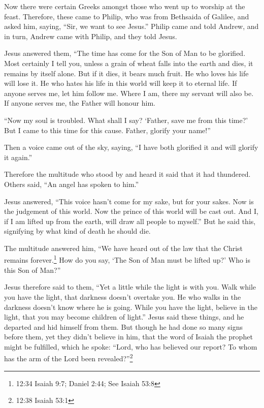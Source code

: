  Now there were certain Greeks amongst those who went up to
worship at the feast.  Therefore, these came to Philip, who
was from Bethsaida of Galilee, and asked him, saying, ``Sir, we want to
see Jesus.''  Philip came and told Andrew, and in turn,
Andrew came with Philip, and they told Jesus.

 Jesus answered them, ``The time has come for the Son of
Man to be glorified.  Most certainly I tell you, unless a
grain of wheat falls into the earth and dies, it remains by itself
alone. But if it dies, it bears much fruit.  He who loves
his life will lose it. He who hates his life in this world will keep it
to eternal life.  If anyone serves me, let him follow me.
Where I am, there my servant will also be. If anyone serves me, the
Father will honour him.

 ``Now my soul is troubled. What shall I say? `Father, save
me from this time?' But I came to this time for this cause.
 Father, glorify your name!''

Then a voice came out of the sky, saying, ``I have both glorified it and
will glorify it again.''

 Therefore the multitude who stood by and heard it said
that it had thundered. Others said, ``An angel has spoken to him.''

 Jesus answered, ``This voice hasn't come for my sake, but
for your sakes.  Now is the judgement of this world. Now
the prince of this world will be cast out.  And I, if I am
lifted up from the earth, will draw all people to myself.''
 But he said this, signifying by what kind of death he
should die.

 The multitude answered him, ``We have heard out of the law
that the Christ remains forever.\footnote{12:34 Isaiah 9:7; Daniel 2:44;
  See Isaiah 53:8} How do you say, `The Son of Man must be lifted up?'
Who is this Son of Man?''

 Jesus therefore said to them, ``Yet a little while the
light is with you. Walk while you have the light, that darkness doesn't
overtake you. He who walks in the darkness doesn't know where he is
going.  While you have the light, believe in the light,
that you may become children of light.'' Jesus said these things, and he
departed and hid himself from them.  But though he had done
so many signs before them, yet they didn't believe in him, 
that the word of Isaiah the prophet might be fulfilled, which he spoke:
``Lord, who has believed our report? To whom has the arm of the Lord
been revealed?''\footnote{12:38 Isaiah 53:1}


